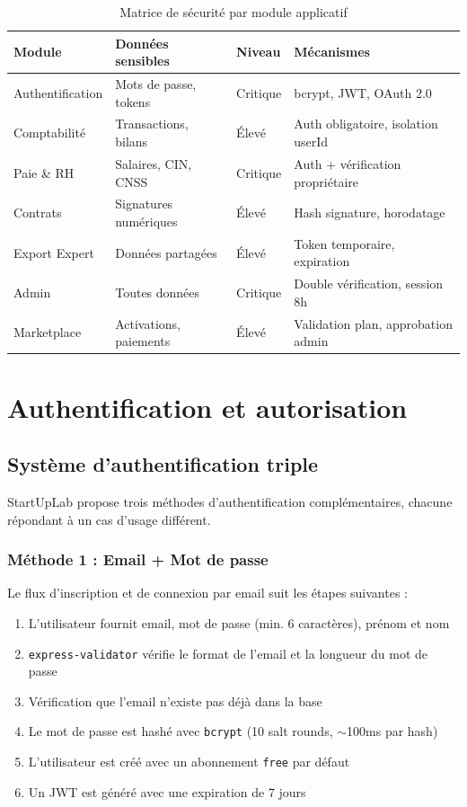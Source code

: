 \begin{table}[H]
\centering
\caption{Matrice de sécurité par module applicatif}
\label{tab:security-matrix}
\begin{tabular}{|l|l|l|l|}
\hline
\textbf{Module} & \textbf{Données sensibles} & \textbf{Niveau} & \textbf{Mécanismes} \\
\hline
Authentification & Mots de passe, tokens & Critique & bcrypt, JWT, OAuth 2.0 \\
\hline
Comptabilité & Transactions, bilans & Élevé & Auth obligatoire, isolation userId \\
\hline
Paie \& RH & Salaires, CIN, CNSS & Critique & Auth + vérification propriétaire \\
\hline
Contrats & Signatures numériques & Élevé & Hash signature, horodatage \\
\hline
Export Expert & Données partagées & Élevé & Token temporaire, expiration \\
\hline
Admin & Toutes données & Critique & Double vérification, session 8h \\
\hline
Marketplace & Activations, paiements & Élevé & Validation plan, approbation admin \\
\hline
\end{tabular}
\end{table}

\section{Authentification et autorisation}

\subsection{Système d'authentification triple}

StartUpLab propose trois méthodes d'authentification complémentaires, chacune répondant à un cas d'usage différent.

\subsubsection{Méthode 1 : Email + Mot de passe}

Le flux d'inscription et de connexion par email suit les étapes suivantes :

\begin{enumerate}
    \item L'utilisateur fournit email, mot de passe (min. 6 caractères), prénom et nom
    \item \texttt{express-validator} vérifie le format de l'email et la longueur du mot de passe
    \item Vérification que l'email n'existe pas déjà dans la base
    \item Le mot de passe est hashé avec \texttt{bcrypt} (10 salt rounds, $\sim$100ms par hash)
    \item L'utilisateur est créé avec un abonnement \texttt{free} par défaut
    \item Un JWT est généré avec une expiration de 7 jours
\end{enumerate}

